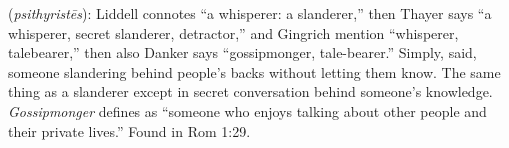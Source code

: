 \item[Gossipmonger,]

(\textit{psithyristēs}):
Liddell connotes ``a whisperer: a slanderer,'' then Thayer says ``a whisperer, secret slanderer, detractor,'' and Gingrich mention ``whisperer, talebearer,'' then also Danker says ``gossipmonger, tale-bearer.'' Simply, said, someone slandering behind people's backs without letting them know. The same thing as a slanderer except in secret conversation behind someone's knowledge. \emph{Gossipmonger} defines as ``someone who enjoys talking about other people and their private lives.''
Found in Rom 1:29.
